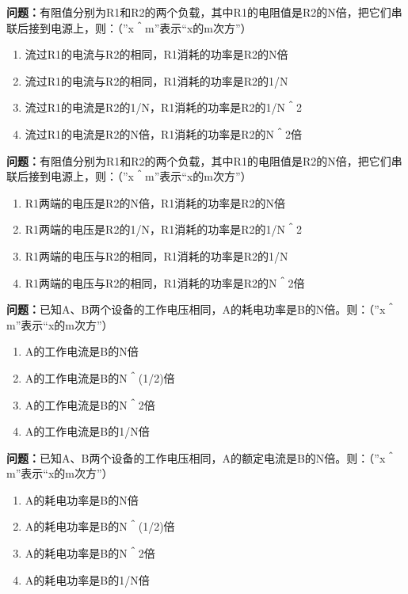 \bigskip


\noindent\textbf{问题：}有阻值分别为R1和R2的两个负载，其中R1的电阻值是R2的N倍，把它们串联后接到电源上，则：（”x＾m”表示“x的m次方”）
\begin{enumerate}[label=\Alph*), leftmargin=3em]
\item 流过R1的电流与R2的相同，R1消耗的功率是R2的N倍
\item 流过R1的电流与R2的相同，R1消耗的功率是R2的1/N
\item 流过R1的电流是R2的1/N，R1消耗的功率是R2的1/N＾2
\item 流过R1的电流是R2的N倍，R1消耗的功率是R2的N＾2倍
\end{enumerate}

\bigskip


\noindent\textbf{问题：}有阻值分别为R1和R2的两个负载，其中R1的电阻值是R2的N倍，把它们串联后接到电源上，则：（”x＾m”表示“x的m次方”）
\begin{enumerate}[label=\Alph*), leftmargin=3em]
\item R1两端的电压是R2的N倍，R1消耗的功率是R2的N倍
\item R1两端的电压是R2的1/N，R1消耗的功率是R2的1/N＾2
\item R1两端的电压与R2的相同，R1消耗的功率是R2的1/N
\item R1两端的电压与R2的相同，R1消耗的功率是R2的N＾2倍
\end{enumerate}

\bigskip


\noindent\textbf{问题：}已知A、B两个设备的工作电压相同，A的耗电功率是B的N倍。则：（”x＾m”表示“x的m次方”）
\begin{enumerate}[label=\Alph*), leftmargin=3em]
\item A的工作电流是B的N倍
\item A的工作电流是B的N＾(1/2)倍
\item A的工作电流是B的N＾2倍
\item A的工作电流是B的1/N倍
\end{enumerate}

\bigskip


\noindent\textbf{问题：}已知A、B两个设备的工作电压相同，A的额定电流是B的N倍。则：（”x＾m”表示“x的m次方”）
\begin{enumerate}[label=\Alph*), leftmargin=3em]
\item A的耗电功率是B的N倍
\item A的耗电功率是B的N＾(1/2)倍
\item A的耗电功率是B的N＾2倍
\item A的耗电功率是B的1/N倍
\end{enumerate}

